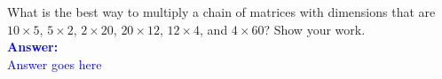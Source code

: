 \item{}
What is the best way to multiply a chain of matrices with dimensions that are
$10\times5$, $5\times2$, $2\times20$, $20\times12$, $12\times4$, and
$4\times60$? Show your work.\\[12pt]
\ifanswers
\textcolor{blue}{
\textbf{Answer:}\\[6pt]
Answer goes here
}
\newpage
\fi
